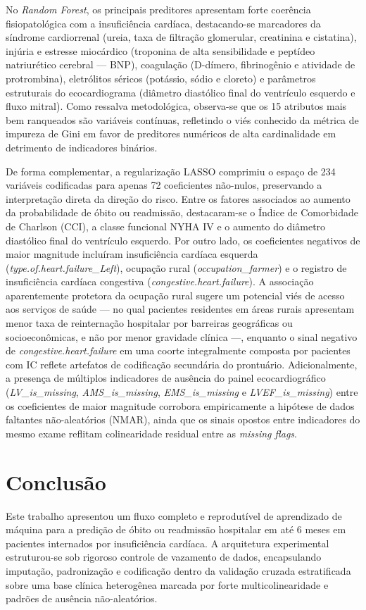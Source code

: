 \documentclass[conference]{IEEEtran}
\begin{document}
No \textit{Random Forest}, os principais preditores apresentam forte coerência fisiopatológica com a insuficiência cardíaca, destacando-se marcadores da síndrome cardiorrenal (ureia, taxa de filtração glomerular, creatinina e cistatina), injúria e estresse miocárdico (troponina de alta sensibilidade e peptídeo natriurético cerebral --- BNP), coagulação (D-dímero, fibrinogênio e atividade de protrombina), eletrólitos séricos (potássio, sódio e cloreto) e parâmetros estruturais do ecocardiograma (diâmetro diastólico final do ventrículo esquerdo e fluxo mitral). Como ressalva metodológica, observa-se que os 15 atributos mais bem ranqueados são variáveis contínuas, refletindo o viés conhecido da métrica de impureza de Gini em favor de preditores numéricos de alta cardinalidade em detrimento de indicadores binários.

De forma complementar, a regularização LASSO comprimiu o espaço de 234 variáveis codificadas para apenas 72 coeficientes não-nulos, preservando a interpretação direta da direção do risco. Entre os fatores associados ao aumento da probabilidade de óbito ou readmissão, destacaram-se o Índice de Comorbidade de Charlson (CCI), a classe funcional NYHA IV e o aumento do diâmetro diastólico final do ventrículo esquerdo. Por outro lado, os coeficientes negativos de maior magnitude incluíram insuficiência cardíaca esquerda (\textit{type.of.heart.failure\_Left}), ocupação rural (\textit{occupation\_farmer}) e o registro de insuficiência cardíaca congestiva (\textit{congestive.heart.failure}). A associação aparentemente protetora da ocupação rural sugere um potencial viés de acesso aos serviços de saúde --- no qual pacientes residentes em áreas rurais apresentam menor taxa de reinternação hospitalar por barreiras geográficas ou socioeconômicas, e não por menor gravidade clínica ---, enquanto o sinal negativo de \textit{congestive.heart.failure} em uma coorte integralmente composta por pacientes com IC reflete artefatos de codificação secundária do prontuário. Adicionalmente, a presença de múltiplos indicadores de ausência do painel ecocardiográfico (\textit{LV\_is\_missing}, \textit{AMS\_is\_missing}, \textit{EMS\_is\_missing} e \textit{LVEF\_is\_missing}) entre os coeficientes de maior magnitude corrobora empiricamente a hipótese de dados faltantes não-aleatórios (NMAR), ainda que os sinais opostos entre indicadores do mesmo exame reflitam colinearidade residual entre as \textit{missing flags}.

\section{Conclusão}
Este trabalho apresentou um fluxo completo e reprodutível de aprendizado de máquina para a predição de óbito ou readmissão hospitalar em até 6 meses em pacientes internados por insuficiência cardíaca. A arquitetura experimental estruturou-se sob rigoroso controle de vazamento de dados, encapsulando imputação, padronização e codificação dentro da validação cruzada estratificada sobre uma base clínica heterogênea marcada por forte multicolinearidade e padrões de ausência não-aleatórios.
\end{document}

